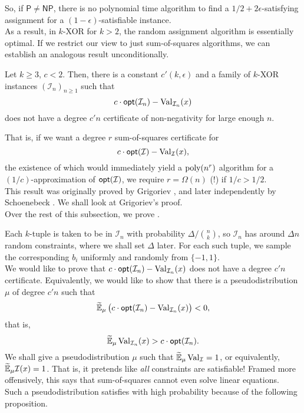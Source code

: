 	So, if $\mathsf{P} \ne \mathsf{NP}$, there is no polynomial time algorithm to find a $1/2 + 2\epsilon$-satisfying assignment for a $(1-\epsilon)$-satisfiable instance.\\
	As a result, in $k$-XOR for $k > 2$, the random assignment algorithm is essentially optimal. If we restrict our view to just sum-of-squares algorithms, we can establish an analogous result unconditionally.

	\begin{ftheo}
		\label{def:kxor-hard}
		Let $k \ge 3$, $c < 2$. Then, there is a constant $c'(k,\epsilon)$ and a family of $k$-XOR instances $(\mathcal{I}_n)_{n \ge 1}$ such that
		\[ c \cdot \mathsf{opt}(\mathcal{I}_n) - \operatorname{Val}_{\mathcal{I}_n}(x) \]
		does not have a degree $c'n$ certificate of non-negativity for large enough $n$.
	\end{ftheo}

	That is, if we want a degree $r$ sum-of-squares certificate for
	\[ c \cdot \mathsf{opt}(\mathcal{I}) - \operatorname{Val}_\mathcal{I}(x), \]
	the existence of which would immediately yield a $\operatorname{poly}(n^r)$ algorithm for a $(1/c)$-approximation of $\mathsf{opt}(\mathcal{I})$, we require $r = \Omega(n)$ (!) if $1/c > 1/2$.\\
	This result was originally proved by Grigoriev \cite{grigoriev-kxor-positivstellensatz}, and later independently by Schoenebeck \cite{schoenebeck-kxor}. We shall look at Grigoriev's proof.\\
	Over the rest of this subsection, we prove .

	Each $k$-tuple is taken to be in $\mathcal{I}_n$ with probability $\Delta/\binom{n}{k}$, so $\mathcal{I}_n$ has around $\Delta n$ random constraints, where we shall set $\Delta$ later. For each such tuple, we sample the corresponding $b_i$ uniformly and randomly from $\{-1,1\}$.\\
	We would like to prove that $c \cdot \mathsf{opt}(\mathcal{I}_n) - \operatorname{Val}_{\mathcal{I}_n}(x)$ does not have a degree $c'n$ certificate. Equivalently, we would like to show that there is a pseudodistribution $\mu$ of degree $c'n$ such that
	\[ \widetilde{\mathbb{E}}_\mu \left(c \cdot \mathsf{opt}(\mathcal{I}_n) - \operatorname{Val}_{\mathcal{I}_n}(x)\right) < 0, \]
	that is,
	\begin{equation}
		\label{eq:grig-pd}
		\widetilde{\mathbb{E}}_\mu \operatorname{Val}_{\mathcal{I}_n}(x) > c \cdot \mathsf{opt}(\mathcal{I}_n).
	\end{equation}
	We shall give a pseudodistribution $\mu$ such that $\widetilde{\mathbb{E}}_\mu \operatorname{Val}_\mathcal{I} = 1$, or equivalently, $\widetilde{\mathbb{E}}_\mu \mathcal{I}(x) = 1$. That is, it pretends like \emph{all} constraints are satisfiable! Framed more offensively, this says that sum-of-squares cannot even solve linear equations.\\
	Such a pseudodistribution satisfies  with high probability because of the following proposition.

